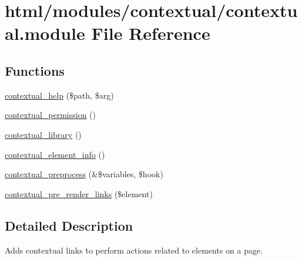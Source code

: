 \hypertarget{contextual_8module}{
\section{html/modules/contextual/contextual.module File Reference}
\label{contextual_8module}
}
\subsection*{Functions}
\begin{DoxyCompactItemize}
\item 
\hyperlink{contextual_8module_a96cade96d323d453c0dc975738d805c2}{contextual\_\-help} (\$path, \$arg)
\item 
\hyperlink{contextual_8module_a5a266483e5b6edffd2fe826a7f1a43bd}{contextual\_\-permission} ()
\item 
\hyperlink{contextual_8module_a2484e12bee0a02cf70f1f21544b49fac}{contextual\_\-library} ()
\item 
\hyperlink{contextual_8module_a2a9686f026c3602b46ba08f4b651edd6}{contextual\_\-element\_\-info} ()
\item 
\hyperlink{contextual_8module_a2c7f7612d49ab547e1b47afed806a21e}{contextual\_\-preprocess} (\&\$variables, \$hook)
\item 
\hyperlink{contextual_8module_a8092553aa170452c7082015e1b930d6b}{contextual\_\-pre\_\-render\_\-links} (\$element)
\end{DoxyCompactItemize}


\subsection{Detailed Description}
Adds contextual links to perform actions related to elements on a page. 

